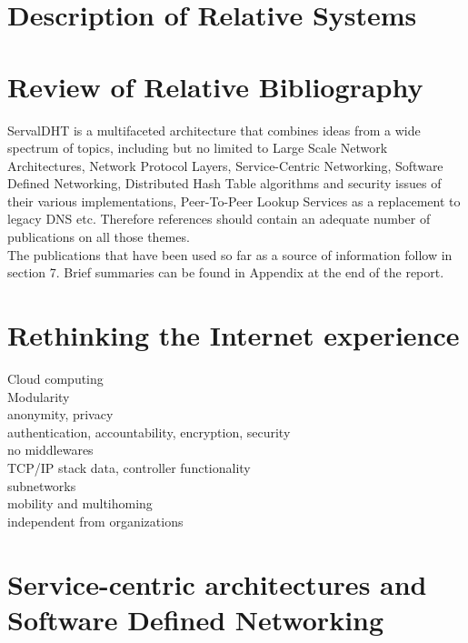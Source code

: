 \documentclass[12pt,a4paper,oneside]{article}
\begin{document}
\newpage
\section{Description of Relative Systems}



\newpage
\section{Review of Relative Bibliography}
ServalDHT is a multifaceted architecture that combines ideas from a wide spectrum of topics, including but no limited to Large Scale Network Architectures, Network Protocol Layers, Service-Centric Networking, Software Defined Networking, Distributed Hash Table algorithms and security issues of their various implementations, Peer-To-Peer Lookup Services as a replacement to legacy DNS etc.
Therefore references should contain an adequate number of publications on all those themes.\\
\indent The publications that have been used so far as a source of information follow in section 7.
Brief summaries can be found in Appendix at the end of the report.


\newpage
\section{Rethinking the Internet experience}
Cloud computing
\\Modularity
\\anonymity, privacy
\\authentication, accountability, encryption, security
\\no middlewares
\\TCP/IP stack data, controller functionality
\\subnetworks
\\mobility and multihoming
\\independent from organizations


\newpage
\section{Service-centric architectures and Software Defined Networking}
\end{document}
